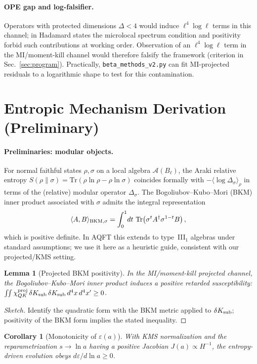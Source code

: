 \documentclass[aps,prd,onecolumn,superscriptaddress,nofootinbib]{revtex4-2}
\newtheorem{lemma}{Lemma}
\newtheorem{corollary}{Corollary}
\begin{document}
\paragraph{OPE gap and log-falsifier.}
Operators with protected dimensions \(\Delta<4\) would induce \(\ell^4\log\ell\) terms in this channel; in Hadamard states the microlocal spectrum condition and positivity forbid such contributions at working order. Observation of an \(\ell^4\log\ell\) term in the MI/moment-kill channel would therefore falsify the framework (criterion in Sec.~\ref{sec:program}). Practically, \texttt{beta\_methods\_v2.py} can fit MI-projected residuals to a logarithmic shape to test for this contamination.

\section{Entropic Mechanism Derivation (Preliminary)}
\label{app:entropic-proof}

\paragraph{Preliminaries: modular objects.}
For normal faithful states \(\rho,\sigma\) on a local algebra \(\mathcal A(B_\ell)\), the Araki relative entropy
\(S(\rho\|\sigma)=\mathrm{Tr}(\rho\ln\rho-\rho\ln\sigma)\) coincides formally with \(-\langle \log\Delta_\sigma\rangle_\rho\) in terms of the (relative) modular operator \(\Delta_\sigma\). The Bogoliubov--Kubo--Mori (BKM) inner product associated with \(\sigma\) admits the integral representation
\[
\langle A,B\rangle_{\rm BKM,\sigma}=\int_0^1\!dt~\mathrm{Tr}\!\left(\sigma^t A^\dagger \sigma^{1-t}B\right),
\]
which is positive definite. In AQFT this extends to type~III\(_1\) algebras under standard assumptions; we use it here as a heuristic guide, consistent with our projected/KMS setting.

\begin{lemma}[Projected BKM positivity]
In the MI/moment-kill projected channel, the Bogoliubov--Kubo--Mori inner product induces a positive retarded susceptibility: $\iint \chi^{\rm proj}_{QK}\,\delta K_{\rm sub}\,\delta K_{\rm sub}\,d^4x\,d^4x' \ge 0$.
\end{lemma}
\begin{proof}[Sketch]
Identify the quadratic form with the BKM metric applied to $\delta K_{\rm sub}$; positivity of the BKM form implies the stated inequality.
\end{proof}
\begin{corollary}[Monotonicity of $\varepsilon(a)$]
With KMS normalization and the reparametrization $s\to\ln a$ having a positive Jacobian $J(a)\propto H^{-1}$, the entropy-driven evolution obeys $d\varepsilon/d\ln a\ge 0$.
\end{corollary}
\end{document}
